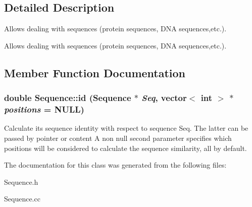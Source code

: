 \subsection{Detailed Description}
Allows dealing with sequences (protein sequences, DNA sequences,etc.). 

Allows dealing with sequences (protein sequences, DNA sequences,etc.). 



\subsection{Member Function Documentation}
\subsubsection{\setlength{\rightskip}{0pt plus 5cm}double Sequence::id ({\bf Sequence} $\ast$ {\em Seq}, vector$<$ int $>$ $\ast$ {\em positions} = NULL)}\label{classSequence_a8}


Calculate its sequence identity with respect to sequence Seq. The latter can be passed by pointer or content A non null second parameter specifies which positions will be considered to calculate the sequence similarity, all by default. 

The documentation for this class was generated from the following files:\begin{CompactItemize}
\item 
Sequence.h\item 
Sequence.cc\end{CompactItemize}
